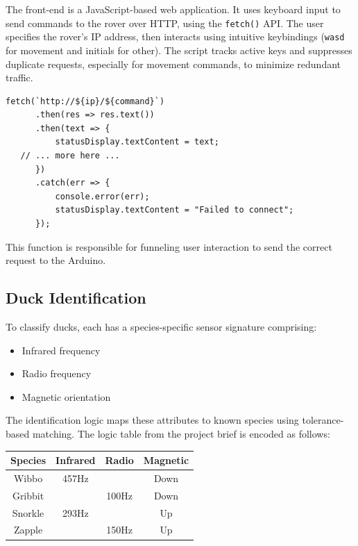 The front-end is a JavaScript-based web application. It uses keyboard input to send commands to the rover over HTTP, using the \texttt{fetch()} API. The user specifies the rover’s IP address, then interacts using intuitive keybindings (\texttt{wasd} for movement and initials for other). The script tracks active keys and suppresses duplicate requests, especially for movement commands, to minimize redundant traffic.

\begin{verbatim}
fetch(`http://${ip}/${command}`)  
      .then(res => res.text())  
      .then(text => {  
          statusDisplay.textContent = text;  
   // ... more here ...  
      })  
      .catch(err => {  
          console.error(err);  
          statusDisplay.textContent = "Failed to connect";  
      });
\end{verbatim}

This function is responsible for funneling user interaction to send the correct request to the Arduino.

\subsection*{Duck Identification}
To classify ducks, each has a species-specific sensor signature comprising:
\begin{itemize}
  \item Infrared frequency
  \item Radio frequency
  \item Magnetic orientation
\end{itemize}

The identification logic maps these attributes to known species using tolerance-based matching. The logic table from the project brief is encoded as follows:

\begin{center}
  \begin{tabular}{|c|c|c|c|}
    \hline
    Species & Infrared & Radio & Magnetic \\
    \hline
    Wibbo   & 457Hz    &       & Down     \\
    Gribbit &          & 100Hz & Down     \\
    Snorkle & 293Hz    &       & Up       \\
    Zapple  &          & 150Hz & Up       \\
    \hline
  \end{tabular}
\end{center}

